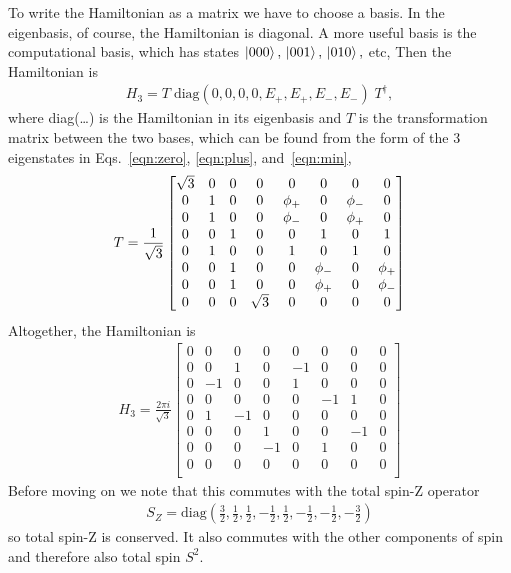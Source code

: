 To write the Hamiltonian as a matrix we have to choose a basis. In the eigenbasis, of course, the Hamiltonian is diagonal. A more useful basis is the computational basis, which has states $\left|000\right\rangle,\,\left|001\right\rangle,\,\left|010\right\rangle,$ etc,
Then the Hamiltonian is 
\begin{align}
H_3 = T\; \text{diag}(0,0,0,0,E_+,E_+,E_-,E_-)\; T^\dag,
\end{align}
where diag(\dots) is the Hamiltonian in its eigenbasis and $T$ is the transformation matrix between the two bases, which can be found from the form of the 3 eigenstates in Eqs.~\ref{eqn:zero}, \ref{eqn:plus}, and~\ref{eqn:min},
\begin{align}
T = \frac{1}{\sqrt{3}}\begin{bmatrix}
\sqrt{3} & 0 & 0 & 0        & 0      & 0      & 0      & 0      \\
0        & 1 & 0 & 0        & \phi_+ & 0      & \phi_- & 0      \\
0        & 1 & 0 & 0        & \phi_- & 0      & \phi_+ & 0      \\
0        & 0 & 1 & 0        & 0      & 1      & 0      & 1      \\
0        & 1 & 0 & 0        & 1      & 0      & 1      & 0      \\
0        & 0 & 1 & 0        & 0      & \phi_- & 0      & \phi_+ \\
0        & 0 & 1 & 0        & 0      & \phi_+ & 0      & \phi_- \\
0        & 0 & 0 & \sqrt{3} & 0      & 0      & 0      & 0
\end{bmatrix}
\end{align}
Altogether, the Hamiltonian is
\begin{align}
H_3 = \frac{2\pi i}{\sqrt{3}}\begin{bmatrix}
0 & 0  & 0  & 0  & 0  & 0  & 0  & 0 \\
0 & 0  & 1  & 0  & -1 & 0  & 0  & 0 \\
0 & -1 & 0  & 0  & 1  & 0  & 0  & 0 \\
0 & 0  & 0  & 0  & 0  & -1 & 1  & 0 \\
0 & 1  & -1 & 0  & 0  & 0  & 0  & 0 \\
0 & 0  & 0  & 1  & 0  & 0  & -1 & 0 \\
0 & 0  & 0  & -1 & 0  & 1  & 0  & 0 \\
0 & 0  & 0  & 0  & 0  & 0  & 0  & 0 \\
\end{bmatrix}\label{eqn:3ham}
\end{align}
Before moving on we note that this commutes with the total spin-Z operator 
\begin{align}
S_Z = \text{diag}(\frac{3}{2}, \frac{1}{2}, \frac{1}{2}, -\frac{1}{2}, \frac{1}{2}, -\frac{1}{2}, -\frac{1}{2}, -\frac{3}{2})
\end{align}
so total spin-Z is conserved. It also commutes with the other components of spin and therefore also total spin $S^2$.

